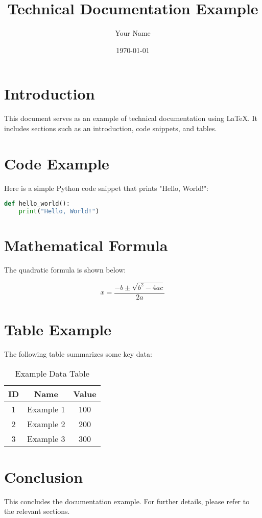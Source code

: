\documentclass{article}
\title{Technical Documentation Example}
\author{Your Name}
\date{\today}
\begin{document}
\maketitle

\section{Introduction}
This document serves as an example of technical documentation using LaTeX. It includes sections such as an introduction, code snippets, and tables.

\section{Code Example}
Here is a simple Python code snippet that prints "Hello, World!":

\begin{lstlisting}[language=Python]
def hello_world():
    print("Hello, World!")
\end{lstlisting}

\section{Mathematical Formula}
The quadratic formula is shown below:

\[
x = \frac{-b \pm \sqrt{b^2 - 4ac}}{2a}
\]

\section{Table Example}
The following table summarizes some key data:

\begin{table}[h!]
\centering
\begin{tabular}{|c|c|c|}
\hline
\textbf{ID} & \textbf{Name} & \textbf{Value} \\
\hline
1 & Example 1 & 100 \\
2 & Example 2 & 200 \\
3 & Example 3 & 300 \\
\hline
\end{tabular}
\caption{Example Data Table}
\end{table}

\section{Conclusion}
This concludes the documentation example. For further details, please refer to the relevant sections.
\end{document}
